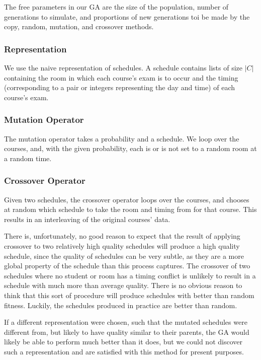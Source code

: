\documentclass[letterpaper]{article}
\begin{document}
      The free parameters in our GA are the size of the population, number of
      generations to simulate, and proportions of new generations toi be made by the copy, 
      random, mutation, and crossover methods.
      
    \subsubsection{Representation}
      We use the naive representation of schedules. A schedule contains lists of size $|C|$
      containing the room in which each course's exam is to occur and the timing
      (corresponding to a pair or integers representing the day and time) of each course's
      exam.
      
    \subsubsection{Mutation Operator}
      The mutation operator takes a probability and a schedule. We loop over the courses,
      and, with the given probability, each is or is not set to a random room at a random time.
      
    \subsubsection{Crossover Operator}
      Given two schedules, the crossover operator loops over the courses, and chooses at
      random which schedule to take the room and timing from for that course. This results 
      in an interleaving of the original courses' data.
      
      There is, unfortunately, no good reason to expect that the result of applying 
      crossover to two relatively high quality schedules will produce a high quality 
      schedule, since the quality of schedules can be very subtle, as they are a more 
      global property of the schedule than this process captures. The crossover of two 
      schedules where no student or room has a timing conflict is unlikely to result in 
      a schedule with much more than average quality. There is no obvious reason to think 
      that this sort of procedure will produce schedules with better than random fitness. 
      Luckily, the schedules produced in practice are better than random.
      
      If a different representation were chosen, such that the mutated schedules were
      different from, but likely to have quality similar to their parents, the GA would 
      likely be able to perform much better than it does, but we could not discover such a
      representation and are satisfied with this method for present purposes.
      
\end{document}
